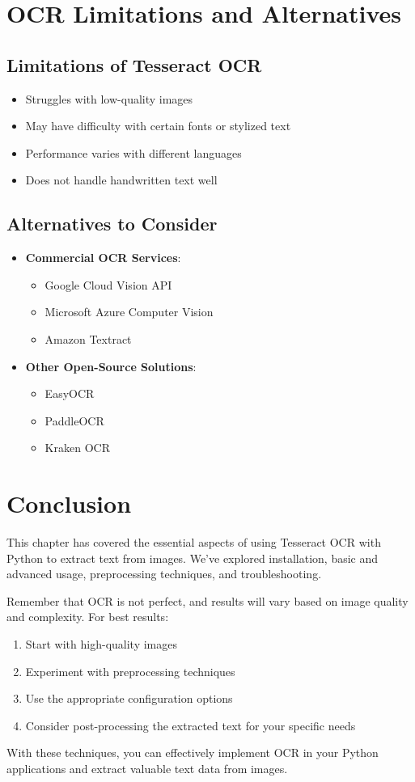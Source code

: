 \documentclass{book}
\begin{document}
	\section{OCR Limitations and Alternatives}
	
	\subsection{Limitations of Tesseract OCR}
	\begin{itemize}
		\item Struggles with low-quality images
		\item May have difficulty with certain fonts or stylized text
		\item Performance varies with different languages
		\item Does not handle handwritten text well
	\end{itemize}
	
	\subsection{Alternatives to Consider}
	\begin{itemize}
		\item \textbf{Commercial OCR Services}: 
		\begin{itemize}
			\item Google Cloud Vision API
			\item Microsoft Azure Computer Vision
			\item Amazon Textract
		\end{itemize}
		
		\item \textbf{Other Open-Source Solutions}:
		\begin{itemize}
			\item EasyOCR
			\item PaddleOCR
			\item Kraken OCR
		\end{itemize}
	\end{itemize}
	
	\section{Conclusion}
	This chapter has covered the essential aspects of using Tesseract OCR with Python to extract text from images. We've explored installation, basic and advanced usage, preprocessing techniques, and troubleshooting.
	
	Remember that OCR is not perfect, and results will vary based on image quality and complexity. For best results:
	\begin{enumerate}
		\item Start with high-quality images
		\item Experiment with preprocessing techniques
		\item Use the appropriate configuration options
		\item Consider post-processing the extracted text for your specific needs
	\end{enumerate}
	
	With these techniques, you can effectively implement OCR in your Python applications and extract valuable text data from images.
	
	
	
\end{document}

